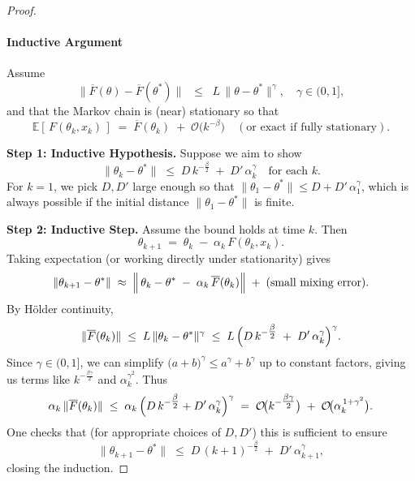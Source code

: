 \begin{proof}
\paragraph{Inductive Argument}
Assume 
\[
  \|\overline{F}(\theta) - \overline{F}(\theta^*)\|
  \;\;\le\;\;
  L\,\|\theta - \theta^*\|^\gamma,
  \quad
  \gamma \in (0,1],
\]
and that the Markov chain is (near) stationary so that
\[
  \mathbb{E}[\,F(\theta_k,x_k)\,]
  \;=\;
  \overline{F}(\theta_k)
  \;+\;
  \mathcal{O}\!\bigl(k^{-\beta}\bigr)
  \quad
  (\text{or exact if fully stationary}).
\]

\smallskip
\noindent
\textbf{Step 1: Inductive Hypothesis.}
Suppose we aim to show 
\[
  \|\theta_k - \theta^*\|
  \;\le\;
  D\,k^{-\tfrac{\beta}{2}}
  \;+\;
  D'\,\alpha_k^\gamma
  \quad
  \text{for each }k.
\]
For $k=1$, we pick $D,D'$ large enough so that
\(\|\theta_1 - \theta^*\|\le D + D'\,\alpha_1^\gamma\),
which is always possible if the initial distance
\(\|\theta_1-\theta^*\|\) is finite.

\smallskip
\noindent
\textbf{Step 2: Inductive Step.}
Assume the bound holds at time \(k\). Then
\[
  \theta_{k+1}
  \;=\;
  \theta_k \;-\;\alpha_k\,F(\theta_k,x_k).
\]
Taking expectation (or working directly under stationarity) gives
\[
  \|\theta_{k+1} - \theta^*\|
  \;\approx\;
  \Bigl\|\,
    \theta_k - \theta^*
    \;-\;
    \alpha_k\,\overline{F}(\theta_k)
  \Bigr\|
  \;+\;
  \text{(small mixing error)}.
\]
By H\"older continuity,
\[
  \|\overline{F}(\theta_k)\|
  \;\le\;
  L\,\|\theta_k - \theta^*\|^\gamma
  \;\le\;
  L\,\Bigl(
         D\,k^{-\tfrac{\beta}{2}}
         \;+\;
         D'\,\alpha_k^\gamma
       \Bigr)^\gamma.
\]
Since $\gamma \in (0,1]$, we can simplify
\(\bigl(a+b\bigr)^\gamma \leq a^\gamma + b^\gamma\) up to constant factors, giving us terms like $k^{-\tfrac{\beta\gamma}{2}}$ and $\alpha_k^{\gamma^2}$. Thus
\[
  \alpha_k\,\|\overline{F}(\theta_k)\|
  \;\le\;
  \alpha_k \,\Bigl(
     D\,k^{-\tfrac{\beta}{2}} + D'\,\alpha_k^\gamma
  \Bigr)^\gamma
  \;=\;
  \mathcal{O}\!\bigl(
     k^{-\tfrac{\beta\gamma}{2}}
  \bigr)
  \;+\;
  \mathcal{O}\!\bigl(
     \alpha_k^{\,1+\gamma^2}
  \bigr).
\]
One checks that (for appropriate choices of $D,D'$) this is sufficient to ensure
\[
  \|\theta_{k+1} - \theta^*\|
  \;\le\;
  D\,(k+1)^{-\tfrac{\beta}{2}}
  \;+\;
  D'\,\alpha_{k+1}^\gamma,
\]
closing the induction.


\end{proof}
